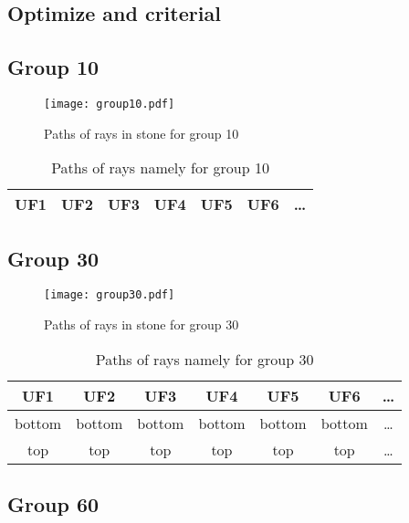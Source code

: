 \subsection*{Optimize and criterial}
\subsection*{Group 10}






\begin{figure}[h!]
\centering
\texttt{[image: group10.pdf]}
\caption{Paths of rays in stone for group 10}
\label{table:FigGroup10}
\end{figure}



\begin{table}[h!]
\centering
\begin{tabular}{|c|c|c|c|c|c|c|}
\hline
UF1 & UF2 & UF3 & UF4 & UF5 & UF6 & \dots \\
\hline
\end{tabular}
\caption{Paths of rays namely for group 10}
\label{table:TableGroup10}
\end{table}
\newpage
\subsection*{Group 30}






\begin{figure}[h!]
\centering
\texttt{[image: group30.pdf]}
\caption{Paths of rays in stone for group 30}
\label{table:FigGroup30}
\end{figure}



\begin{table}[h!]
\centering
\begin{tabular}{|c|c|c|c|c|c|c|}
\hline
UF1 & UF2 & UF3 & UF4 & UF5 & UF6 & \dots \\
\hline
bottom & bottom & bottom & bottom & bottom & bottom & \dots \\
\hline
top & top & top & top & top & top & \dots \\
\hline
\end{tabular}
\caption{Paths of rays namely for group 30}
\label{table:TableGroup30}
\end{table}
\newpage
\subsection*{Group 60}






